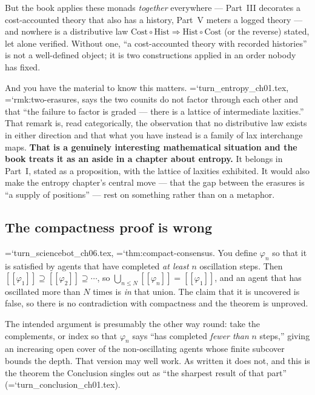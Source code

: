 \documentclass[11pt,letterpaper]{article}
\newcommand{\loc}[1]{{\small\ttfamily\color{accent}\hyphenchar\font=`\-\relax #1}}
\newcommand{\fnd}[1]{\textbf{\color{warn}#1}}
\providecommand{\llbracket}{[\![}
\providecommand{\rrbracket}{]\!]}
\begin{document}
But the book applies these monads \emph{together} everywhere ---
Part~III decorates a cost-accounted theory that also has a history,
Part~V meters a logged theory --- and nowhere is a distributive law
$\mathrm{Cost} \circ \mathrm{Hist} \Rightarrow \mathrm{Hist} \circ
\mathrm{Cost}$ (or the reverse) stated, let alone verified. Without
one, ``a cost-accounted theory with recorded histories'' is not a
well-defined object; it is two constructions applied in an order
nobody has fixed.

And you have the material to know this matters.
\loc{turn\_entropy\_ch01.tex}, \loc{rmk:two-erasures}, says the two
counits do not factor through each other and that ``the failure to
factor is graded --- there is a lattice of intermediate laxities.'' That
remark is, read categorically, the observation that no distributive law
exists in either direction and that what you have instead is a family
of lax interchange maps. \fnd{That is a genuinely interesting
mathematical situation and the book treats it as an aside in a chapter
about entropy.} It belongs in Part~I, stated as a proposition, with
the lattice of laxities exhibited. It would also make the entropy
chapter's central move --- that the gap between the erasures is ``a
supply of positions'' --- rest on something rather than on a metaphor.

\subsection*{The compactness proof is wrong}

\loc{turn\_sciencebot\_ch06.tex},
\loc{thm:compact-consensus}. You define
$\varphi_n$ so that it is satisfied by agents that have completed
\emph{at least} $n$ oscillation steps. Then
$\llbracket\varphi_1\rrbracket \supseteq
\llbracket\varphi_2\rrbracket \supseteq \cdots$, so
$\bigcup_{n \le N} \llbracket\varphi_n\rrbracket =
\llbracket\varphi_1\rrbracket$, and an agent that has oscillated more
than $N$ times is \emph{in} that union. The claim that it is
uncovered is false, so there is no contradiction with compactness and
the theorem is unproved.

The intended argument is presumably the other way round: take the
complements, or index so that $\varphi_n$ says ``has completed
\emph{fewer than} $n$ steps,'' giving an increasing open cover of the
non-oscillating agents whose finite subcover bounds the depth. That
version may well work. As written it does not, and this is the theorem
the Conclusion singles out as ``the sharpest result of that part''
(\loc{turn\_conclusion\_ch01.tex}).
\end{document}
